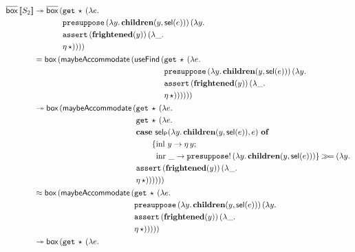 \begin{align*}
  \ap{\DBOX}{\sem{S_2}}
  &\tto \ap{\DBOX}{
    \begin{aligned}[t]
      (&\app{\op{get}}{\star}{(\lam{e}{ \\
       &\app{\op{presuppose}}{(\lam{y}{\obj{children}(y, \sel(e))})}{(\lam{y}{ \\
       &\app{\op{assert}}{(\obj{frightened}(y))}{(\lam{\_}{ \\
       &\etaE{\star}})}})}})})
    \end{aligned}} \\
  &= \ap{\BOX}{(\ap{\maybeAccommodate}{(\ap{\useFind}{
    \begin{aligned}[t]
      (&\app{\op{get}}{\star}{(\lam{e}{ \\
       &\app{\op{presuppose}}{(\lam{y}{\obj{children}(y, \sel(e))})}{(\lam{y}{ \\
       &\app{\op{assert}}{(\obj{frightened}(y))}{(\lam{\_}{ \\
       &\etaE{\star}})}})}})})
    ))\end{aligned}}}} \\
  &\tto \ap{\BOX}{(\ap{\maybeAccommodate}{
    \begin{aligned}[t]
      (&\app{\op{get}}{\star}{(\lam{e}{ \\
       &\app{\op{get}}{\star}{(\lam{e}{ \\
       &\casenl{\selP(\lam{y}{\obj{children}(y, \sel(e))}, e)}{y}{\etaE{y}}{\_}{\ap{\op{presuppose}!}{(\lam{y}{\obj{children}(y, \sel(e))})}} \hsbind (\lam{y}{ \\
       &\app{\op{assert}}{(\obj{frightened}(y))}{(\lam{\_}{ \\
       &\etaE{\star}})}})})}})})
    )\end{aligned}}} \\
  &\approx \ap{\BOX}{(\ap{\maybeAccommodate}{
    \begin{aligned}[t]
      (&\app{\op{get}}{\star}{(\lam{e}{ \\
       &\app{\op{presuppose}}{(\lam{y}{\obj{children}(y, \sel(e))})}{(\lam{y}{ \\
       &\app{\op{assert}}{(\obj{frightened}(y))}{(\lam{\_}{ \\
       &\etaE{\star}})}})}})})
    )\end{aligned}}} \\
  &\tto \ap{\BOX}{
    \begin{aligned}[t]
      (&\app{\op{get}}{\star}{(\lam{e}{ \\
       &\quad \begin{aligned}[t]

\end{aligned}}}
\end{aligned}}
\end{align*}
